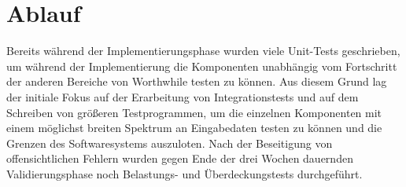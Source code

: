 \section{Ablauf}

Bereits während der Implementierungsphase wurden viele Unit-Tests geschrieben, um während der Implementierung die Komponenten unabhängig vom Fortschritt der anderen Bereiche von Worthwhile testen zu können. Aus diesem Grund lag der initiale Fokus auf der Erarbeitung von Integrationstests und auf dem Schreiben von größeren Testprogrammen, um die einzelnen Komponenten mit einem möglichst breiten Spektrum an Eingabedaten testen zu können und die Grenzen des Softwaresystems auszuloten. Nach der Beseitigung von offensichtlichen Fehlern wurden gegen Ende der drei Wochen dauernden Validierungsphase noch Belastungs- und Überdeckungstests durchgeführt.
